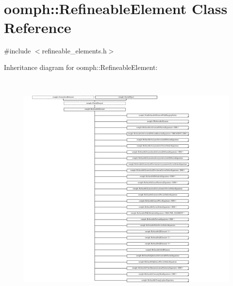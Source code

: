 \hypertarget{classoomph_1_1RefineableElement}{}\section{oomph\+:\+:Refineable\+Element Class Reference}
\label{classoomph_1_1RefineableElement}


{\ttfamily \#include $<$refineable\+\_\+elements.\+h$>$}

Inheritance diagram for oomph\+:\+:Refineable\+Element\+:\begin{figure}[H]
\begin{center}
\leavevmode
\includegraphics[height=12.000000cm]{classoomph_1_1RefineableElement}
\end{center}
\end{figure}
